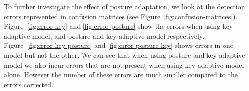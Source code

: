 \documentclass{sigchi}
\begin{document}
To further investigate the effect of posture adaptation, we look at the detection
errors represented in confusion matrices (see Figure~\ref{fig:confusion-matrices}). Figure~\ref{fig:error-key} and \ref{fig:error-posture}
show the errors when using key adaptive model, and posture and key adaptive model respectively. Figure~\ref{fig:error-key-posture}
and \ref{fig:error-posture-key} shows errors in one model but not the other.
We can see that when using posture and key adaptive model we also incur errors
that are not present when using key adaptive model alone. However the number of these
errors are much smaller compared to the errors corrected.

\begin{figure}[tb]
  \centering
\end{figure}
\end{document}
